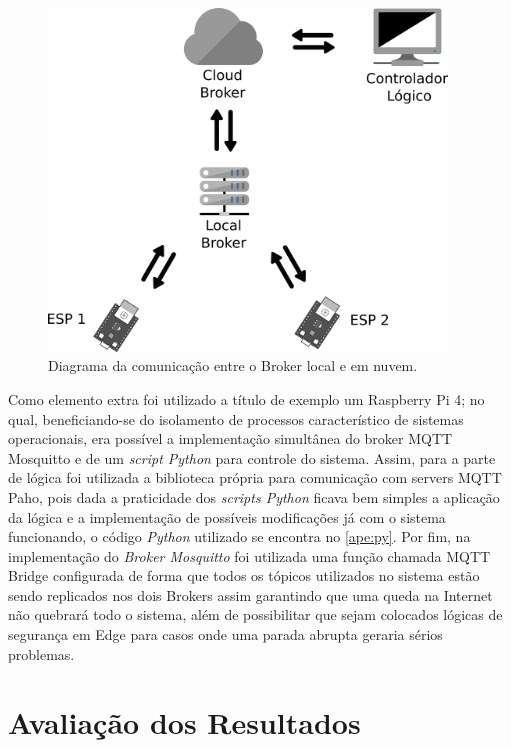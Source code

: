 \begin{figure}[htb]
    \begin{center}
	    \includegraphics[width=300pt]{figs/diag_conn.png}
	\end{center}
	\caption{\label{fig:conn} Diagrama da comunicação entre o Broker local e em nuvem.} 
\end{figure}


Como elemento extra foi utilizado a título de exemplo um Raspberry Pi 4; no qual, beneficiando-se do isolamento de processos 
característico de sistemas operacionais, era possível a implementação simultânea do broker \ac{MQTT} Mosquitto e de um \textit{script 
Python} para controle do sistema. Assim, para a parte de lógica foi utilizada a biblioteca própria para comunicação com 
servers \ac{MQTT} Paho, pois dada a praticidade dos \textit{scripts Python} ficava bem simples a aplicação da lógica e a implementação 
de possíveis modificações já com o sistema funcionando, o código \textit{Python} utilizado se encontra no \autoref{ape:py}. Por fim, na implementação do \textit{Broker Mosquitto} foi utilizada uma 
função chamada \ac{MQTT} Bridge\cite{mosq-doc} configurada de forma que todos os tópicos utilizados no sistema estão sendo 
replicados nos dois Brokers assim garantindo que uma queda na Internet não quebrará todo o sistema, além de possibilitar
que sejam colocados lógicas de segurança em Edge para casos onde uma parada abrupta geraria sérios problemas.

\section{Avaliação dos Resultados}
\label{avaliacao}

